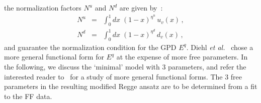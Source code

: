 the normalization factors $N^u$ and $N^d$ are given by~:  
\begin{eqnarray}
N^u &=&  \int _{0}^{1}dx \; (1 - x)^{\eta^u} \, u_v(x) \, ,
		\nonumber\\
N^d &=&  \int _{0}^{1}dx \; (1 - x)^{\eta^d} \, d_v(x) \, ,
\label{eq:nd}  
\end{eqnarray} 
and guarantee the normalization condition for the GPD $E^q$. 
\indent
Diehl {\it et al.}~\cite{diehl} chose a more 
general functional form for $E^q$ at the expense of more free parameters. 
In the following, we discuss the `minimal' model with 3 parameters, 
and refer the interested reader to~\cite{diehl} for a study of more 
general functional forms. 
The 3 free parameters in the resulting modified Regge ansatz 
are to be determined from a fit to the FF data. 




